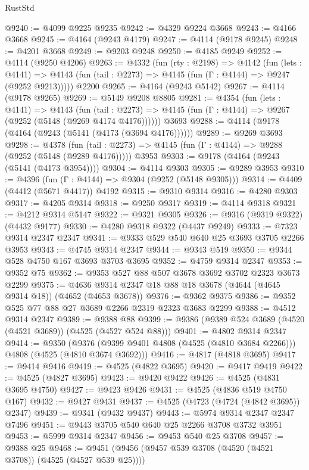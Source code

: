 \begin{lexlean}{RustStd}
\begin{coremodule}
{\begin{coremodule}
{{{{{{{{{{{{{{@9240 := @4099 @9225 @9235
@9242 := @4329 @9224 @3668
@9243 := @4166 @3668
@9245 := @4164 (@9243 @4179)
@9247 := @4114 (@9178 @9245)
@9248 := @4201 @3668
@9249 := @9203 @9248
@9250 := @4185 @9249
@9252 := @4114 (@9250 @4206)
@9263 := @4332
    (fun (rty : @2198) =>
    @4142
      (fun (lets : @4141) =>
      @4143 (fun (tail : @2273) => @4145 (fun (Γ : @4144) => @9247 (@9252 @9213)))))
    @2200
@9265 := @4164 (@9243 @5142)
@9267 := @4114 (@9178 @9265)
@9269 := @5149 @9208 @8805
@9281 := @4354
    (fun (lets : @4141) =>
    @4143
      (fun (tail : @2273) => @4145 (fun (Γ : @4144) => @9267 (@9252 (@5148 (@9269 @4174 @4176))))))
    @3693
@9288 := @4114 (@9178 (@4164 (@9243 (@5141 (@4173 (@3694 @4176))))))
@9289 := @9269 @3693
@9298 := @4378
    (fun (tail : @2273) => @4145 (fun (Γ : @4144) => @9288 (@9252 (@5148 (@9289 @4176)))))
    @3953
@9303 := @9178 (@4164 (@9243 (@5141 (@4173 @3954))))
@9304 := @4114 @9303
@9305 := @9289 @3953
@9310 := @4396 (fun (Γ : @4144) => @9304 (@9252 (@5148 @9305)))
@9314 := @4409 (@4412 (@5671 @4417)) @4192
@9315 := @9310 @9314
@9316 := @4280 @9303
@9317 := @4205 @9314
@9318 := @9250 @9317
@9319 := @4114 @9318
@9321 := @4212 @9314 @5147
@9322 := @9321 @9305
@9326 := @9316 (@9319 @9322) (@4432 @9177)
@9330 := @4280 @9318 @9322 (@4437 @9249)
@9333 := @7323 @9314 @2347 @2347
@9341 := @9333 @529 @540 @640 @25 @3693 @3705 @2266 @3953
@9343 := @4745 @9314 @2347
@9344 := @9343 @519
@9350 := @9344 @528 @4750 @167 @3693 @3703 @3695
@9352 := @4759 @9314 @2347
@9353 := @9352 @75
@9362 := @9353 @527 @88 @507 @3678 @3692 @3702 @2323 @3673 @2299
@9375 := @4636 @9314 @2347 @18 @88 @18 @3678 (@4644 (@4645 @9314 @18)) (@4652 (@4653 @3678))
@9376 := @9362 @9375
@9386 := @9352 @525 @77 @88 @27 @3689 @2266 @2319 @2323 @3683 @2299
@9388 := @4512 @9314 @2347
@9389 := @9388 @88
@9399 := @9386 (@9389 @524 @3689 (@4520 (@4521 @3689)) (@4525 (@4527 @524 @88)))
@9401 := @4802 @9314 @2347
@9414 := @9350
    (@9376 (@9399 @9401 @4808 (@4525 (@4810 @3684 @2266))) @4808 (@4525 (@4810 @3674 @3692)))
@9416 := @4817 (@4818 @3695)
@9417 := @9414 @9416
@9419 := @4525 (@4822 @3695)
@9420 := @9417 @9419
@9422 := @4525 (@4827 @3695)
@9423 := @9420 @9422
@9426 := @4525 (@4831 @3695 @4750)
@9427 := @9423 @9426
@9431 := @4525 (@4836 @519 @4750 @167)
@9432 := @9427 @9431
@9437 := @4525 (@4723 (@4724 (@4842 @3695)) @2347)
@9439 := @9341 (@9432 @9437)
@9443 := @5974 @9314 @2347 @2347 @7496
@9451 := @9443 @3705 @540 @640 @25 @2266 @3708 @3732 @3951
@9453 := @5999 @9314 @2347
@9456 := @9453 @540 @25 @3708
@9457 := @9388 @25
@9468 := @9451 (@9456 (@9457 @539 @3708 (@4520 (@4521 @3708)) (@4525 (@4527 @539 @25))))
}}}}}}}}}}}}}}
\end{coremodule}}
\end{coremodule}
\end{lexlean}
